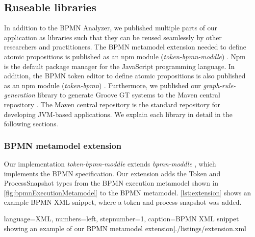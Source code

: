 \documentclass{lmcs} %
\begin{document}


\subsection{Ruseable libraries}
In addition to the BPMN Analyzer, we published multiple parts of our application as libraries such that they can be reused seamlessly by other researchers and practitioners.
The BPMN metamodel extension needed to define atomic propositions is published as an npm module (\textit{token-bpmn-moddle}) \cite{timkrauterLMCS2024Artifacts2023}.
Npm is the default package manager for the JavaScript programming language.
In addition, the BPMN token editor to define atomic propositions is also published as an npm module (\textit{token-bpmn}) \cite{timkrauterLMCS2024Artifacts2023}.
Furthermore, we published our \textit{graph-rule-generation} library to generate Groove GT systems to the Maven central repository \cite{timkrauterLMCS2024Artifacts2023}.
The Maven central repository is the standard repository for developing JVM-based applications.
We explain each library in detail in the following sections.

\subsubsection{BPMN metamodel extension}
Our implementation \textit{token-bpmn-moddle} \cite{timkrauterLMCS2024Artifacts2023} extends \textit{bpmn-moddle} \cite{camundaservicesgmbhBpmnmoddle2023}, which implements the BPMN specification.
Our extension adds the \textsf{Token} and \textsf{ProcessSnapshot} types from the BPMN execution metamodel shown in \autoref{fig:bpmnExecutionMetamodel} to the BPMN metamodel.
\autoref{lst:extension} shows an example BPMN XML snippet, where a token and process snapshot was added.

 language=XML, numbers=left,
    stepnumber=1, caption=BPMN XML snippet showing an example of our BPMN metamodel extension]{./listings/extension.xml}
\end{document}

